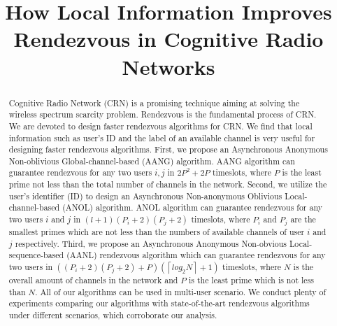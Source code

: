 \documentclass[10pt, conference, letterpaper]{IEEEtran}
\begin{document}


\title{How Local Information Improves Rendezvous in Cognitive Radio Networks}

%

\maketitle


\begin{abstract}
Cognitive Radio Network (CRN) is a promising technique aiming at solving the wireless spectrum scarcity problem. Rendezvous is the fundamental process of CRN.  We are devoted to design faster rendezvous algorithms for CRN. We find that local information such as user's ID and the label of an available channel is very useful for designing faster rendezvous algorithms. First, we propose an Asynchronous  Anonymous Non-oblivious Global-channel-based (AANG) algorithm. AANG algorithm can guarantee rendezvous for any two users $i,j$ in $2P^2+2P$ timeslots, where $P$ is the least prime not less than the total number of channels in the network. Second, we utilize the user's identifier (ID) to design an Asynchronous Non-anonymous Oblivious Local-channel-based (ANOL) algorithm. ANOL algorithm can guarantee rendezvous for any two users $i$ and $j$ in $(l+1)(P_i+2)(P_j+2)$ timeslots, where $P_i$ and $P_j$ are the smallest primes which are not less than the numbers of available channels of user $i$ and $j$ respectively. Third, we propose an Asynchronous Anonymous Non-obvious Local-sequence-based (AANL) rendezvous algorithm which can guarantee rendezvous for any two users in $((P_i +2)(P_j+2) + P)(\left \lceil log_2 N \right \rceil + 1)$ timeslots, where $N$ is the overall amount of channels in the network and $P$ is the least prime which is not less than $N$.  All of our algorithms can be used in multi-user scenario. We conduct plenty of experiments comparing our algorithms with state-of-the-art rendezvous algorithms under different scenarios, which corroborate our analysis.
\end{abstract}
\end{document}
